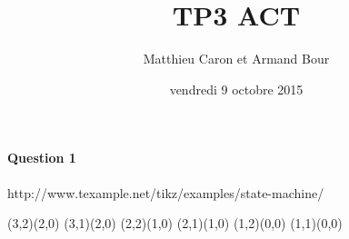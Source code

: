 \documentclass[a4paper,10pt]{article}
\title{TP3 ACT}
\author{Matthieu Caron et Armand Bour}
\date{vendredi 9 octobre 2015}
\begin{document}
\maketitle

\paragraph{Question 1}

http://www.texample.net/tikz/examples/state-machine/



(3,2)(2,0)
(3,1)(2,0)
(2,2)(1,0)
(2,1)(1,0)
(1,2)(0,0)
(1,1)(0,0)
\end{document}
